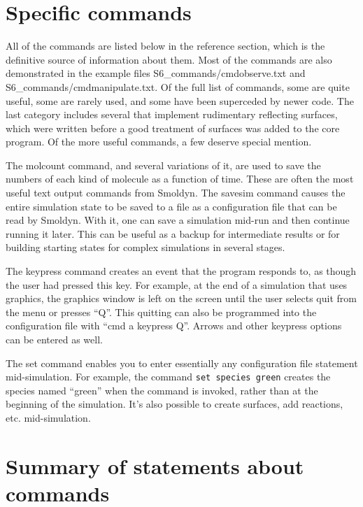 \documentclass {scrbook}
\newcommand {\ttt} {\texttt}
\begin{document}
\section{Specific commands}

All of the commands are listed below in the reference section, which is the definitive source of information about them. Most of the commands are also demonstrated in the example files S6\_commands/cmdobserve.txt and S6\_commands/cmdmanipulate.txt. Of the full list of commands, some are quite useful, some are rarely used, and some have been superceded by newer code. The last category includes several that implement rudimentary reflecting surfaces, which were written before a good treatment of surfaces was added to the core program. Of the more useful commands, a few deserve special mention.

The molcount command, and several variations of it, are used to save the numbers of each kind of molecule as a function of time. These are often the most useful text output commands from Smoldyn.
The savesim command causes the entire simulation state to be saved to a file as a configuration file that can be read by Smoldyn. With it, one can save a simulation mid-run and then continue running it later. This can be useful as a backup for intermediate results or for building starting states for complex simulations in several stages.

The keypress command creates an event that the program responds to, as though the user had pressed this key. For example, at the end of a simulation that uses graphics, the graphics window is left on the screen until the user selects quit from the menu or presses ``Q''. This quitting can also be programmed into the configuration file with ``cmd a keypress Q''. Arrows and other keypress options can be entered as well.

The set command enables you to enter essentially any configuration file statement mid-simulation. For example, the command \ttt{set species green} creates the species named ``green'' when the command is invoked, rather than at the beginning of the simulation. It's also possible to create surfaces, add reactions, etc. mid-simulation.

\section{Summary of statements about commands}
\end{document}
